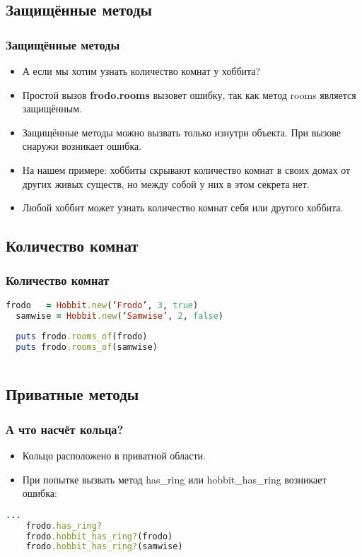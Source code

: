 \documentclass[compress,red]{beamer}
\begin{document}
\subsection{Защищённые методы}
\begin{frame}[fragile]
  \frametitle{Защищённые методы}
  \begin{itemize}
    \item А если мы хотим узнать количество комнат у хоббита?
    \item Простой вызов \textbf{frodo.rooms} вызовет ошибку, так как метод rooms является защищённым.
    \item Защищённые методы можно вызвать только изнутри объекта. При вызове снаружи возникает ошибка.
    \item На нашем примере: хоббиты скрывают количество комнат в своих домах от других живых существ, но между собой у них в этом секрета нет.
    \item Любой хоббит может узнать количество комнат себя или другого хоббита.
  \end{itemize}
\end{frame}

\subsection{Количество комнат}
\begin{frame}[fragile]
  \frametitle{Количество комнат}
  \scriptsize{
  \begin{lstlisting}[language=ruby,basicstyle=\footnotesize,label=ruby4,caption=Количество комнат]
  frodo   = Hobbit.new(‘Frodo’, 3, true)
  samwise = Hobbit.new(‘Samwise’, 2, false)
  
  puts frodo.rooms_of(frodo)
  puts frodo.rooms_of(samwise)
    
  \end{lstlisting}
  }
  
\end{frame}

\subsection{Приватные методы}
\begin{frame}[fragile]
  \frametitle{А что насчёт кольца?}
  \begin{itemize}
    \item Кольцо расположено в приватной области.
    \item При попытке вызвать метод has\_ring или hobbit\_has\_ring возникает ошибка:
  \end{itemize}
  \scriptsize{
  \begin{lstlisting}[language=ruby,basicstyle=\footnotesize,label=ruby5,caption=Ошибка при вызове]
    ...
    frodo.has_ring?
    frodo.hobbit_has_ring?(frodo)  
    frodo.hobbit_has_ring?(samwise)  
  \end{lstlisting}
  }
\end{frame}
\end{document}
